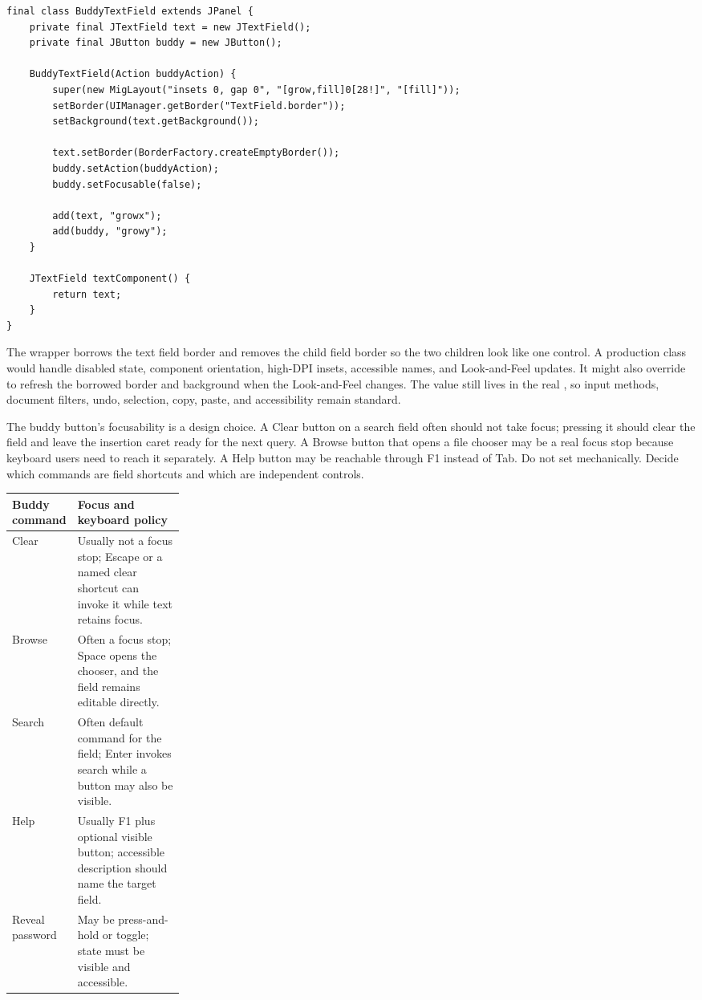 \begin{lstlisting}[caption={A buddy field wrapper keeps the text component visible.}]
final class BuddyTextField extends JPanel {
    private final JTextField text = new JTextField();
    private final JButton buddy = new JButton();

    BuddyTextField(Action buddyAction) {
        super(new MigLayout("insets 0, gap 0", "[grow,fill]0[28!]", "[fill]"));
        setBorder(UIManager.getBorder("TextField.border"));
        setBackground(text.getBackground());

        text.setBorder(BorderFactory.createEmptyBorder());
        buddy.setAction(buddyAction);
        buddy.setFocusable(false);

        add(text, "growx");
        add(buddy, "growy");
    }

    JTextField textComponent() {
        return text;
    }
}
\end{lstlisting}

The wrapper borrows the text field border and removes the child field border so the two
children look like one control. A production class would handle disabled state,
component orientation, high-DPI insets, accessible names, and Look-and-Feel updates. It
might also override  to refresh the borrowed border and background when
the Look-and-Feel changes. The value still lives in the real , so input
methods, document filters, undo, selection, copy, paste, and accessibility remain
standard.

The buddy button's focusability is a design choice. A Clear button on a search field
often should not take focus; pressing it should clear the field and leave the insertion
caret ready for the next query. A Browse button that opens a file chooser may be a real
focus stop because keyboard users need to reach it separately. A Help button may be
reachable through F1 instead of Tab. Do not set  mechanically.
Decide which commands are field shortcuts and which are independent controls.

\begin{tabularx}{0.96\linewidth}{@{}p{0.25\linewidth}X@{}}
\toprule
Buddy command & Focus and keyboard policy\\
\midrule
Clear & Usually not a focus stop; Escape or a named clear shortcut can invoke it while text retains focus.\\
Browse & Often a focus stop; Space opens the chooser, and the field remains editable directly.\\
Search & Often default command for the field; Enter invokes search while a button may also be visible.\\
Help & Usually F1 plus optional visible button; accessible description should name the target field.\\
Reveal password & May be press-and-hold or toggle; state must be visible and accessible.\\
\bottomrule
\end{tabularx}

